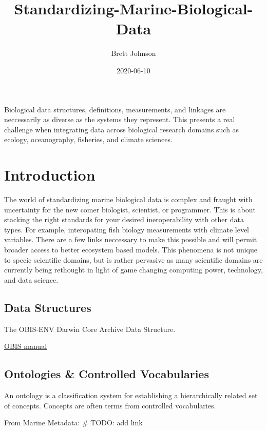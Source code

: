 \documentclass[]{book}
\title{Standardizing-Marine-Biological-Data}
\author{Brett Johnson}
\date{2020-06-10}
\begin{document}
\maketitle

{
\setcounter{tocdepth}{1}
\tableofcontents
}
Biological data structures, definitions, measurements, and linkages are neccessarily as diverse as the systems they represent. This presents a real challenge when integrating data across biological research domains such as ecology, oceanography, fisheries, and climate sciences.

\hypertarget{intro}{%
\chapter{Introduction}\label{intro}}

The world of standardizing marine biological data is complex and fraught with uncertainty for the new comer biologist, scientist, or programmer. This is about stacking the right standards for your desired ineroperability with other data types. For example, interopating fish biology measurements with climate level variables. There are a few links neccessary to make this possible and will permit broader access to better ecosystem based models. This phenomena is not unique to specic scientific domains, but is rather pervasive as many scientific domains are currently being rethought in light of game changing computing power, technology, and data science.

\hypertarget{data-structures}{%
\section{Data Structures}\label{data-structures}}

The OBIS-ENV Darwin Core Archive Data Structure.

\href{\%22https://obis.org/manual/\%22}{OBIS manual}

\hypertarget{ontologies-controlled-vocabularies}{%
\section{Ontologies \& Controlled Vocabularies}\label{ontologies-controlled-vocabularies}}

An ontology is a classification system for establishing a hierarchically related set of concepts. Concepts are often terms from controlled vocabularies.

From Marine Metadata: \# TODO: add link
\end{document}
